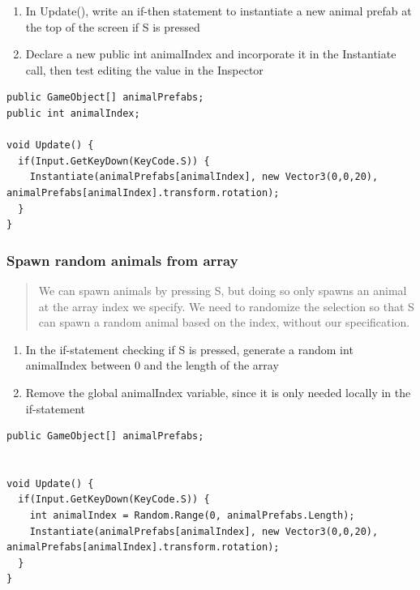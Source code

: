 \documentclass[
]{book}
\providecommand{\tightlist}{%
  \setlength{\itemsep}{0pt}\setlength{\parskip}{0pt}}
\begin{document}
\begin{enumerate}
\def\labelenumi{\arabic{enumi}.}
\tightlist
\item
  In Update(), write an if-then statement to instantiate a new animal prefab at the top of the screen if S is pressed
\item
  Declare a new public int animalIndex and incorporate it in the Instantiate call, then test editing the value in the Inspector
\end{enumerate}

\begin{verbatim}
public GameObject[] animalPrefabs;
public int animalIndex;

void Update() {
  if(Input.GetKeyDown(KeyCode.S)) {
    Instantiate(animalPrefabs[animalIndex], new Vector3(0,0,20), animalPrefabs[animalIndex].transform.rotation);
  }
}
\end{verbatim}

\hypertarget{spawn-random-animals-from-array}{%
\subsubsection{Spawn random animals from array}\label{spawn-random-animals-from-array}}

\begin{quote}
We can spawn animals by pressing S, but doing so only spawns an animal at the array index we specify. We need to randomize the selection so that S can spawn a random animal based on the index, without our specification.
\end{quote}

\begin{enumerate}
\def\labelenumi{\arabic{enumi}.}
\tightlist
\item
  In the if-statement checking if S is pressed, generate a random int animalIndex between 0 and the length of the array
\item
  Remove the global animalIndex variable, since it is only needed locally in the if-statement
\end{enumerate}

\begin{verbatim}
public GameObject[] animalPrefabs;


void Update() {
  if(Input.GetKeyDown(KeyCode.S)) {
    int animalIndex = Random.Range(0, animalPrefabs.Length);
    Instantiate(animalPrefabs[animalIndex], new Vector3(0,0,20), animalPrefabs[animalIndex].transform.rotation);
  }
}
\end{verbatim}
\end{document}
